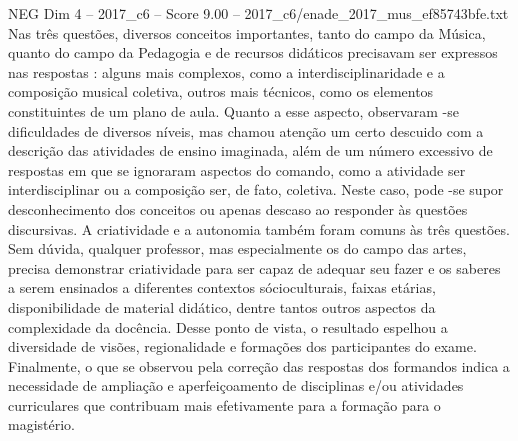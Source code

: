 \begin{textsample}{NEG Dim 4 – 2017\_c6 – Score 9.00 – 2017\_c6/enade\_2017\_mus\_ef85743bfe.txt}
Nas três questões, diversos conceitos importantes, tanto do campo da Música, quanto do campo da Pedagogia e de recursos didáticos precisavam ser expressos nas respostas : alguns mais complexos, como a interdisciplinaridade e a composição musical coletiva, outros mais técnicos, como os elementos constituintes de um plano de aula.
Quanto a esse aspecto, observaram -se dificuldades de diversos níveis, mas chamou atenção um certo descuido com a descrição das atividades de ensino imaginada, além de um número excessivo de respostas em que se ignoraram aspectos do comando, como a atividade ser interdisciplinar ou a composição ser, de fato, coletiva.
Neste caso, pode -se supor desconhecimento dos conceitos ou apenas descaso ao responder às questões discursivas.
A criatividade e a autonomia também foram comuns às três questões.
Sem dúvida, qualquer professor, mas especialmente os do campo das artes, precisa demonstrar criatividade para ser capaz de adequar seu fazer e os saberes a serem ensinados a diferentes contextos sócioculturais, faixas etárias, disponibilidade de material didático, dentre tantos outros aspectos da complexidade da docência.
Desse ponto de vista, o resultado espelhou a diversidade de visões, regionalidade e formações dos participantes do exame.
Finalmente, o que se observou pela correção das respostas dos formandos indica a necessidade de ampliação e aperfeiçoamento de disciplinas e/ou atividades curriculares que contribuam mais efetivamente para a formação para o magistério.

\end{textsample}
